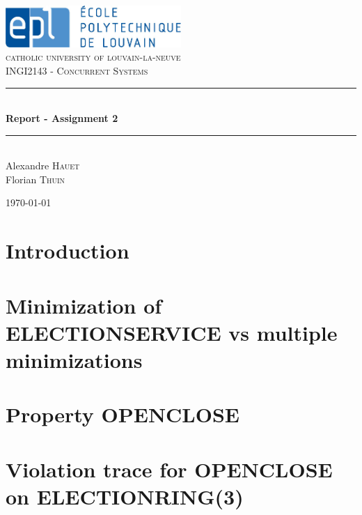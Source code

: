 \documentclass[fleqn]{article}
\newcommand{\HRule}{\rule{\linewidth}{0.5mm}}
\begin{document}
\begin{titlepage}

\begin{center}


\includegraphics[width=0.5\textwidth]{epl-logo.png}\\[1cm]

\textsc{\LARGE catholic university of louvain-la-neuve}\\[1.5cm]

\textsc{\Large INGI2143 - Concurrent Systems}\\[0.5cm]


\HRule \\[0.4cm]
{ \huge \bfseries Report - Assignment 2}\\[0.4cm]

\HRule \\[1.5cm]


{\huge Alexandre \textsc{Hauet} \\[0.6cm] Florian \textsc{Thuin}}


\vfill

{\large \today}

\end{center}

\end{titlepage}


\section{Introduction}



\section{Minimization of ELECTIONSERVICE vs multiple minimizations}



\newpage
\section{Property OPENCLOSE}



\section{Violation trace for OPENCLOSE on ELECTIONRING(3)}
\end{document}
